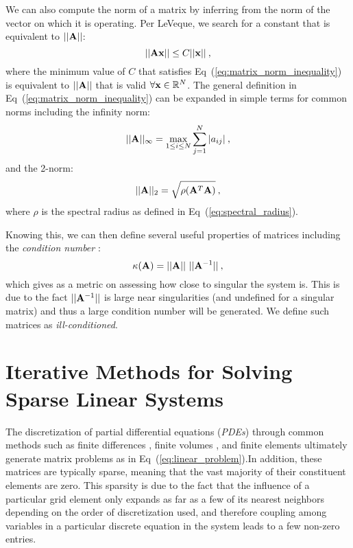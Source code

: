 We can also compute the norm of a matrix by inferring from the norm of
the vector on which it is operating. Per LeVeque, we search for a
constant that is equivalent to $||\mathbf{A}||$:
\begin{equation}
  ||\mathbf{A}\mathbf{x}|| \leq C ||\mathbf{x}||\:,
  \label{eq:matrix_norm_inequality}
\end{equation}
where the minimum value of $C$ that satisfies
Eq~(\ref{eq:matrix_norm_inequality}) is equivalent to $||\mathbf{A}||$
that is valid $\forall \mathbf{x} \in \mathbb{R}^N$. The general
definition in Eq~(\ref{eq:matrix_norm_inequality}) can be expanded in
simple terms for common norms including the infinity norm:
\begin{equation}
  ||\mathbf{A}||_{\infty} = \max_{1 \leq i \leq N} \sum^N_{j=1}|a_{ij}|\:,
  \label{eq:matrix_infinity_norm}
\end{equation}
and the 2-norm:
\begin{equation}
  ||\mathbf{A}||_{2} = \sqrt{\rho(\mathbf{A}^T\mathbf{A})}\:,
  \label{eq:matrix_2_norm}
\end{equation}
where $\rho$ is the spectral radius as defined in
Eq~(\ref{eq:spectral_radius}).

Knowing this, we can then define several useful properties of matrices
including the \textit{condition number} \citep{saad_2003}:
\begin{equation}
  \kappa(\mathbf{A}) = ||\mathbf{A}||\ ||\mathbf{A}^{-1}||\:,
  \label{eq:condition_number}
\end{equation}
which gives as a metric on assessing how close to singular the system
is. This is due to the fact $||\mathbf{A}^{-1}||$ is large near
singularities (and undefined for a singular matrix) and thus a large
condition number will be generated. We define such matrices as
\textit{ill-conditioned}. 

\section{Iterative Methods for Solving Sparse Linear Systems}
\label{sec:linear_methods}
The discretization of partial differential equations (\textit{PDEs})
through common methods such as finite differences
\citep{leveque_2007}, finite volumes \citep{leveque_2002}, and finite
elements \citep{zienkiewicz_1977} ultimately generate matrix problems
as in Eq~(\ref{eq:linear_problem}).In addition, these matrices are
typically sparse, meaning that the vast majority of their constituent
elements are zero. This sparsity is due to the fact that the influence
of a particular grid element only expands as far as a few of its
nearest neighbors depending on the order of discretization used, and
therefore coupling among variables in a particular discrete equation
in the system leads to a few non-zero entries.

